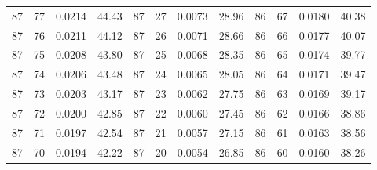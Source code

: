 \begin{tabular}{llll|llll|llll}
87 & 77 & 0.0214 & 44.43 & 87 & 27 & 0.0073 & 28.96 & 86 & 67 & 0.0180 & 40.38\\
87 & 76 & 0.0211 & 44.12 & 87 & 26 & 0.0071 & 28.66 & 86 & 66 & 0.0177 & 40.07\\
87 & 75 & 0.0208 & 43.80 & 87 & 25 & 0.0068 & 28.35 & 86 & 65 & 0.0174 & 39.77\\
87 & 74 & 0.0206 & 43.48 & 87 & 24 & 0.0065 & 28.05 & 86 & 64 & 0.0171 & 39.47\\
87 & 73 & 0.0203 & 43.17 & 87 & 23 & 0.0062 & 27.75 & 86 & 63 & 0.0169 & 39.17\\
87 & 72 & 0.0200 & 42.85 & 87 & 22 & 0.0060 & 27.45 & 86 & 62 & 0.0166 & 38.86\\
87 & 71 & 0.0197 & 42.54 & 87 & 21 & 0.0057 & 27.15 & 86 & 61 & 0.0163 & 38.56\\
87 & 70 & 0.0194 & 42.22 & 87 & 20 & 0.0054 & 26.85 & 86 & 60 & 0.0160 & 38.26\\
\bottomrule
\end{tabular}
\newpage
